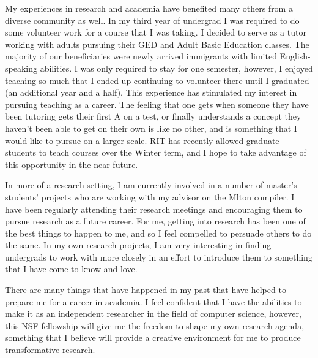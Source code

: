 \documentclass[12pt]{article}
\begin{document}
My experiences in research and academia have benefited many others from a diverse community as well. In my third year of undergrad I was required to do some volunteer work for a course that I was taking. I decided to serve as a tutor working with adults pursuing their GED and Adult Basic Education classes. The majority of our beneficiaries were newly arrived immigrants with limited English-speaking abilities. I was only required to stay for one semester, however, I enjoyed teaching so much that I ended up continuing to volunteer there until I graduated (an additional year and a half). This experience has stimulated my interest in pursuing teaching as a career. The feeling that one gets when someone they have been tutoring gets their first A on a test, or finally understands a concept they haven't been able to get on their own is like no other, and is something that I would like to pursue on a larger scale.  RIT has recently allowed graduate students to teach courses over the Winter term, and I hope to take advantage of this opportunity in the near future.  

In more of a research setting, I am currently involved in a number of master's students' projects who are working with my advisor on the Mlton compiler.  I have been regularly attending their research meetings and encouraging them to pursue research as a future career.  For me, getting into research has been one of the best things to happen to me, and so I feel compelled to persuade others to do the same. In my own research projects, I am very interesting in finding undergrads to work with more closely in an effort to introduce them to something that I have come to know and love.

There are many things that have happened in my past that have helped to prepare me for a career in academia. I feel confident that I have the abilities to make it as an independent researcher in the field of computer science, however, this NSF fellowship will give me the freedom to shape my own research agenda, something that I believe will provide a creative environment for me to produce transformative research.
\end{document}
